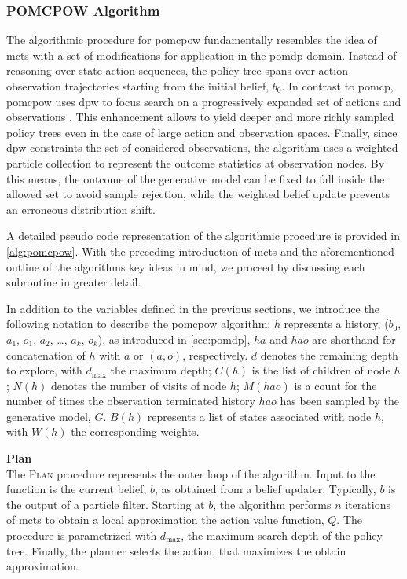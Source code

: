 \subsubsection{POMCPOW Algorithm}

The algorithmic procedure for \ac{pomcpow} fundamentally resembles the idea of
\ac{mcts} with a set of modifications for application in the \ac{pomdp} domain.
Instead of reasoning over state-action sequences, the policy tree spans over
action-observation trajectories starting from the initial belief, $b_0$. In
contrast to \ac{pomcp}, \ac{pomcpow} uses \ac{dpw} to focus search on
a progressively expanded set of actions and observations \cite{silver2010pomcp,
sunberg2018online}. This enhancement allows to yield deeper and more richly
sampled policy trees even in the case of large action and observation spaces.
Finally, since \ac{dpw} constraints the set of considered observations, the
algorithm uses a weighted particle collection to represent the outcome
statistics at observation nodes. By this means, the outcome of the generative
model can be fixed to fall inside the allowed set to avoid sample rejection,
while the weighted belief update prevents an erroneous distribution shift.

A detailed pseudo code representation of the algorithmic procedure is provided
in \cref{alg:pomcpow}. With the preceding introduction of \ac{mcts} and the
aforementioned outline of the algorithms key ideas in mind, we proceed by
discussing each subroutine in greater detail.

In addition to the variables defined in the previous sections, we introduce the
following notation to describe the \ac{pomcpow} algorithm: $h$ represents
a history, ($b_0$, $a_1$, $o_1$, $a_2$, \dots, $a_k$, $o_k$), as introduced in
\cref{sec:pomdp}, $ha$ and $hao$ are shorthand for concatenation of $h$ with
$a$ or $(a, o)$, respectively. $d$ denotes the remaining depth to explore, with
$d_\text{max}$ the maximum depth; $C(h)$ is the list of children of node $h$;
$N(h)$ denotes the number of visits of node $h$; $M(hao)$ is a count for the
number of times the observation terminated history $hao$ has been sampled by
the generative model, $G$. $B(h)$ represents a list of states associated with
node $h$, with $W(h)$ the corresponding weights.

\textbf{Plan}\\
The \textsc{Plan} procedure represents the outer loop of the algorithm. Input
to the function is the current belief, $b$, as obtained from a belief updater.
Typically, $b$ is the output of a particle filter. Starting at $b$, the
algorithm performs $n$ iterations of \ac{mcts} to obtain a local approximation
the action value function, $Q$. The procedure is parametrized with
$d_\text{max}$, the maximum search depth of the policy tree. Finally, the planner
selects the action, that maximizes the obtain \qfunction approximation.

